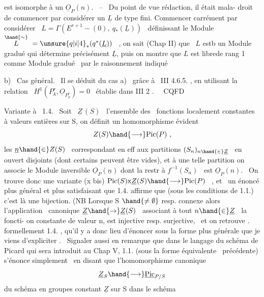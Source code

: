 
\placedmargin{\ensuremath{/}}est isomorphe à un $\underline{O}_P(n)$. \ -- \ Du point de vue rédaction, il était mala-%
droit de commencer par considérer un $\underline{L}$ de type fini. Commencer carrément
par considérer \ $L = \Gamma(E^{r+1}-(0),\ q_*(\underline{L}))$ \ définissant le Module
$\overset{\hand{\sim}}{L} \ = \unsure{q|i|4}_*(q^*(\underline{L}))$ \ , on sait (Chap II) que \ $L$ estb un Module gradué qui
détermine précisément $\underline{L}$, puis on montre que $L$ est librede rang 1 comme Module
gradué \ par le raisonnement indiqué\placedmargin{\ensuremath{\swarrow}}\unsure{\hand{:}|:}

b) \ Cas général. \ Il se déduit du cas a) \ grâce à \ III 4.6.5. , en
utilisant la relation \ $H^1(P^r_k,\underline{O}_{P^r_k}) = 0$ \ établie dans III 2 . \ \ CQFD\placedmargin{\ensuremath{/}}

Variante à \ 1.4. \ Soit \ $\underline{Z}\,(S)$ \ l'ensemble des \ fonctions localement
constantes à valeurs entières sur S, on définit un homomorphisme évident
\[ Z(S) \hand{\longrightarrow} \mathrm{Pic}(P) \ , \]
les  $\underline{n} \hand{\in} Z(S)$ \ correspondant en eff aux  partitions $(S_n)_{n\hand{\in}\underline{Z}}$ \ en ouvert
disjoints (dont certains peuvent être vides),  et  à une
telle partition on associe le Module inversible $\underline{O}_P(\underline{n})$ dont la restr à 
$f^{-1}(S_n)$ \ est $\underline{O}_P(n)$. \ On trouve donc une variante
(x bis) \hfill $\mathrm{Pic}(S)\mathrm{x}\underline{Z}(S) \hand{\longrightarrow} \mathrm{Pic}(P)$ \ , \hfill
et \ un énoncé plus général et plus satisfaisant que 1.4. affirme que
(sous les conditions de 1.1.) c'est là une bijection. (NB Lorsque S $\hand{\neq \emptyset}$
resp. connexe
alors l'application \ canonique $\underline{Z} \hand{\to} \underline{Z}(S)$ \ associant à tout $n \hand{\in} \underline{Z}$ \ la foncti-%
on constante de valeur n, est injective resp. surjective, \ et on retrouve .
formellement 1.4. , qu'il y a donc lieu d'énoncer sous la forme plus
générale que je viens d'expliciter . \ Signaler aussi en remarque que
dans le langage du schéma de Picard qui sera introduit au Chap V, 1.1.
(sous la forme équivalente \ précédente) s'énonce simplement \ en disant que
l'homomorphisme canonique
\[ \underline{Z}_S \hand{\longrightarrow} \underline{\mathrm{Pic}}_{P/S} \]
du schéma en groupes constant  $\underline{Z}$ sur S dans le schéma\placedmargin{\ensuremath{\backslash}}

